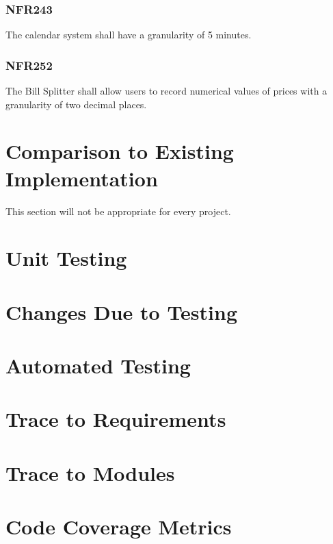 \documentclass[12pt, titlepage]{article}
\begin{document}
\subsubsection{NFR243}
The calendar system shall have a granularity of 5 minutes.
\subsubsection{NFR252}
The Bill Splitter shall allow users to record numerical values of
prices with a granularity of two decimal places.

\section{Comparison to Existing Implementation}	

This section will not be appropriate for every project.

\section{Unit Testing}

\section{Changes Due to Testing}


\section{Automated Testing}
		
\section{Trace to Requirements}
		
\section{Trace to Modules}		

\section{Code Coverage Metrics}
\end{document}
